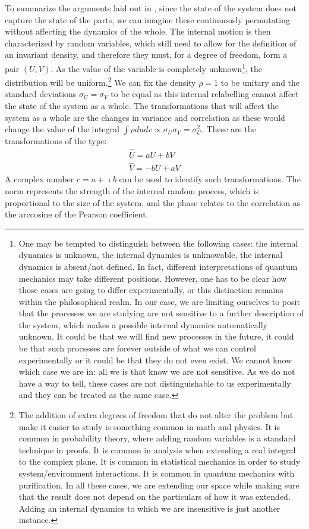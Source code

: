 \documentclass{article}
\begin{document}
To summarize the arguments laid out in \cite{Carc1}, since the state of the system does not capture the state of the parts, we can imagine these continuously permutating without affecting the dynamics of the whole. The internal motion is then characterized by random variables, which still need to allow for the definition of an invariant density, and therefore they must, for a degree of freedom, form a pair $(U,V)$. As the value of the variable is completely unknown\footnote{One may be tempted to distinguish between the following cases: the internal dynamics is unknown, the internal dynamics is unknowable, the internal dynamics is absent/not defined. In fact, different interpretations of quantum mechanics may take different positions. However, one has to be clear how those cases are going to differ experimentally, or this distinction remains within the philosophical realm. In our case, we are limiting ourselves to posit that the processes we are studying are not sensitive to a further description of the system, which makes a possible internal dynamics automatically unknown. It could be that we will find new processes in the future, it could be that such processes are forever outside of what we can control experimentally or it could be that they do not even exist. We cannot know which case we are in: all we is that know we are not sensitive. As we do not have a way to tell, these cases are not distinguishable to us experimentally and they can be treated as the same case.}, the distribution will be uniform.\footnote{The addition of extra degrees of freedom that do not alter the problem but make it easier to study is something common in math and physics. It is common in probability theory, where adding random variables is a standard technique in proofs. It is common in analysis when extending a real integral to the complex plane. It is common in statistical mechanics in order to study system/environment interactions. It is common in quantum mechanics with purification. In all these cases, we are extending our space while making sure that the result does not depend on the particulars of how it was extended. Adding an internal dynamics to which we are insensitive is just another instance.} We can fix the density $\rho=1$ to be unitary and the standard deviations $\sigma_U=\sigma_V$ to be equal as this internal relabelling cannot affect the state of the system as a whole. The transformations that will affect the system as a whole are the changes in variance and correlation as these would change the value of the integral $\int \rho dudv \propto \sigma_U\sigma_V = \sigma_U^2$. These are the transformations of the type:
\begin{equation}
	\begin{aligned}
	\hat{U} = a U + b V \\
	\hat{V} = -b U + a V
	\end{aligned}
\end{equation}
A complex number $c=a + \imath b$ can be used to identify such transformations. The norm represents the strength of the internal random process, which is proportional to the size of the system, and the phase relates to the correlation as the arccosine of the Pearson coefficient.
\end{document}
